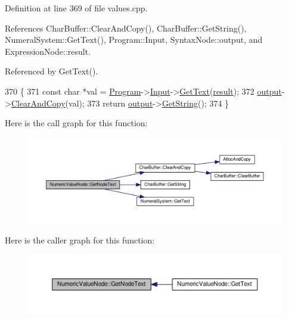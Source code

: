 Definition at line 369 of file values.\+cpp.



References Char\+Buffer\+::\+Clear\+And\+Copy(), Char\+Buffer\+::\+Get\+String(), Numeral\+System\+::\+Get\+Text(), Program\+::\+Input, Syntax\+Node\+::output, and Expression\+Node\+::result.



Referenced by Get\+Text().


\begin{DoxyCode}
370 \{
371     \textcolor{keyword}{const} \textcolor{keywordtype}{char} *val = \hyperlink{classProgram}{Program}->\hyperlink{classProgram_a6327f15962926e4f74f15e8ff56e04e5}{Input}->\hyperlink{classNumeralSystem_a74dc91c4dbab4a88a123b2a32753f485}{GetText}(\hyperlink{classExpressionNode_a1f590649f5a5cb30eb7ee912f7bc1262}{result});
372     \hyperlink{classSyntaxNode_a1180628cbe3fce43930cee0df5a9ce5c}{output}->\hyperlink{classCharBuffer_ac52ed7b91190240eb7db4cf43d1e2abb}{ClearAndCopy}(val);
373     \textcolor{keywordflow}{return} \hyperlink{classSyntaxNode_a1180628cbe3fce43930cee0df5a9ce5c}{output}->\hyperlink{classCharBuffer_a7dfd3feaaf80f318ba44efe15b1ec44b}{GetString}();
374 \}
\end{DoxyCode}


Here is the call graph for this function\+:
\nopagebreak
\begin{figure}[H]
\begin{center}
\leavevmode
\includegraphics[width=350pt]{d4/d9e/classNumericValueNode_a078bf8f0496d2afcb7e3a050110a0c0d_cgraph}
\end{center}
\end{figure}




Here is the caller graph for this function\+:
\nopagebreak
\begin{figure}[H]
\begin{center}
\leavevmode
\includegraphics[width=350pt]{d4/d9e/classNumericValueNode_a078bf8f0496d2afcb7e3a050110a0c0d_icgraph}
\end{center}
\end{figure}



